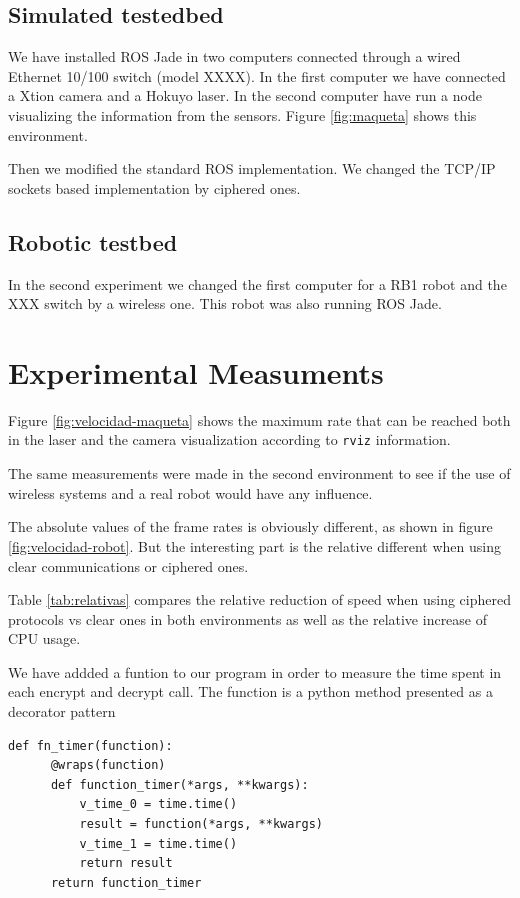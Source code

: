 \documentclass[journal,twoside]{JoPhA}
\begin{document}
\subsection{Simulated testedbed}

We have installed ROS Jade in two computers connected through a wired Ethernet 10/100 switch (model XXXX). In the first computer we have connected a Xtion camera and a Hokuyo laser. In the second computer have run a node visualizing the information from the sensors. Figure \ref{fig:maqueta} shows this environment.


Then we modified the standard ROS implementation. We changed the TCP/IP sockets based implementation by ciphered ones.


\subsection{Robotic testbed}

In the second experiment we changed the first computer for a RB1 robot and the XXX switch by a wireless one. This robot was also running ROS Jade.



\section{Experimental Measuments}




Figure \ref{fig:velocidad-maqueta} shows the maximum rate that can be reached both in the laser and the camera visualization according to \texttt{rviz} information.

The same measurements were made in the second environment to see if the use of wireless systems and a real robot would have any influence.

The absolute values of the frame rates is obviously different, as shown in figure \ref{fig:velocidad-robot}. But the interesting part is the relative different when using clear communications or ciphered ones. 

Table \ref{tab:relativas}  compares the relative reduction of speed when using ciphered protocols vs clear ones in both environments as well as the relative increase of CPU usage.

We have addded a funtion to our program in order to measure the time spent in each encrypt and decrypt call. The function is a python method presented as a decorator pattern 

{
  \footnotesize{
    \begin{verbatim}
def fn_timer(function):
	  @wraps(function)
	  def function_timer(*args, **kwargs):
	      v_time_0 = time.time()
	      result = function(*args, **kwargs)
	      v_time_1 = time.time()
	      return result
	  return function_timer
    \end{verbatim}
  }
}
\end{document}
